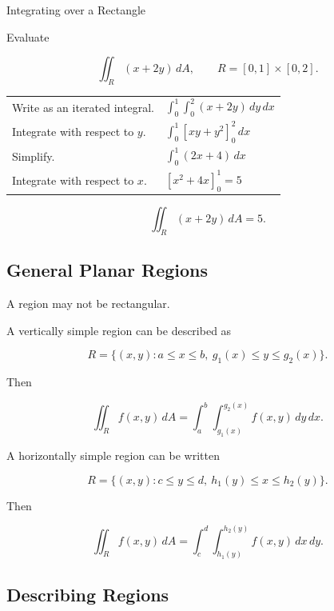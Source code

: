 \begin{workedexamplebox}{Integrating over a Rectangle}

Evaluate

\[ \iint_R(x+2y)\,dA, \qquad
R=[0,1]\times[0,2]. \]

\begin{tabularx}{\textwidth}{@{}>{\raggedright\arraybackslash}p{}X@{}}
Write as an iterated integral. &
\(\displaystyle \int_0^1\int_0^2(x+2y)\,dy\,dx\)\\
Integrate with respect to \(y\). &
\(\displaystyle \int_0^1[xy+y^2]_0^2\,dx\)\\
Simplify. &
\(\displaystyle \int_0^1(2x+4)\,dx\)\\
Integrate with respect to \(x\). &
\(\displaystyle [x^2+4x]_0^1=5\)
\end{tabularx}

\begin{answerbox}
\[ \boxed{\iint_R(x+2y)\,dA=5.} \]
\end{answerbox}
\end{workedexamplebox}

\subsection{General Planar Regions}
\label{subsec:general-planar-regions}

A region may not be rectangular.

A vertically simple region can be described as

\[ R=\{(x,y):a\leq x\leq b,\ g_1(x)\leq y\leq g_2(x)\}. \]

Then

\[ \iint_R f(x,y)\,dA
=
\int_a^b
\int_{g_1(x)}^{g_2(x)}
f(x,y)\,dy\,dx. \]

A horizontally simple region can be written

\[ R=\{(x,y):c\leq y\leq d,\ h_1(y)\leq x\leq h_2(y)\}. \]

Then

\[ \iint_R f(x,y)\,dA
=
\int_c^d
\int_{h_1(y)}^{h_2(y)}
f(x,y)\,dx\,dy. \]

\subsection{Describing Regions}
\label{subsec:describing-regions}

